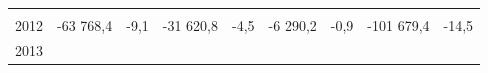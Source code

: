 \begin{longtable}[]{@{}lllllllll@{}}
\begin{minipage}[t]{0.12\columnwidth}
\strut
\end{minipage} & \begin{minipage}[t]{0.06\columnwidth}\raggedright
\strut
\end{minipage} & \begin{minipage}[t]{0.09\columnwidth}\raggedright
\strut
\end{minipage} & \begin{minipage}[t]{0.06\columnwidth}\raggedright
\strut
\end{minipage}\tabularnewline
\begin{minipage}[t]{0.05\columnwidth}\raggedright
2012\strut
\end{minipage} & \begin{minipage}[t]{0.10\columnwidth}\raggedright
-63 768,4\strut
\end{minipage} & \begin{minipage}[t]{0.06\columnwidth}\raggedright
-9,1\strut
\end{minipage} & \begin{minipage}[t]{0.16\columnwidth}\raggedright
-31 620,8\strut
\end{minipage} & \begin{minipage}[t]{0.06\columnwidth}\raggedright
-4,5\strut
\end{minipage} & \begin{minipage}[t]{0.12\columnwidth}\raggedright
-6 290,2\strut
\end{minipage} & \begin{minipage}[t]{0.06\columnwidth}\raggedright
-0,9\strut
\end{minipage} & \begin{minipage}[t]{0.09\columnwidth}\raggedright
-101 679,4\strut
\end{minipage} & \begin{minipage}[t]{0.06\columnwidth}\raggedright
-14,5\strut
\end{minipage}\tabularnewline
\begin{minipage}[t]{0.05\columnwidth}\raggedright
2013\strut
\end{minipage} & \begin{minipage}[t]{0.10\columnwidth}\raggedright
\strut
\end{minipage} & \begin{minipage}[t]{0.06\columnwidth}\raggedright
\strut
\end{minipage} & \begin{minipage}[t]{0.16\columnwidth}\raggedright
\strut
\end{minipage} & \begin{minipage}[t]{0.06\columnwidth}\raggedright

\end{minipage}
\end{longtable}
